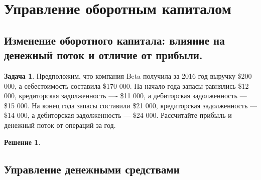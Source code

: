 \documentclass[a4paper, 14pt]{article}
\theoremstyle{plain} %
\theoremstyle{definition} %
\newtheorem*{solution}{Решение}
\newtheorem{problem}{Задача}[subsection]
\theoremstyle{remark} %
\begin{document}
\section{Управление оборотным капиталом}

\subsection{Изменение  оборотного  капитала:  влияние  на  денежный  поток  и  отличие  от прибыли.}

\begin{problem}
	Предположим, что компания Beta получила за 2016 год выручку \$200 000, а себестоимость составила \$170 000. На начало года запасы равнялись \$12 000, кредиторская задолженность ---- \$11 000, а дебиторская задолженность --- \$15 000. На конец года запасы составили \$21  000,  кредиторская  задолженность --- \$14  000,  а  дебиторская  задолженность --- \$24  000. Рассчитайте прибыль и денежный поток от операций за год.
	\begin{solution}

	\end{solution}
\end{problem}

\subsection{Управление денежными средствами}
\end{document}
